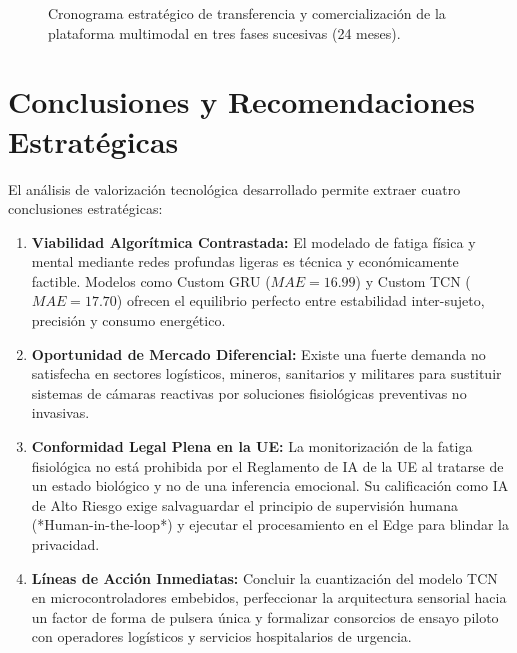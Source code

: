 \begin{figure}[H]
    \caption{Cronograma estratégico de transferencia y comercialización de la plataforma multimodal en tres fases sucesivas (24 meses).}
    \label{fig:roadmap_comercial}
\end{figure}



\section{Conclusiones y Recomendaciones Estratégicas}
\label{sec:val_conclusiones}

El análisis de valorización tecnológica desarrollado permite extraer cuatro conclusiones estratégicas:
\begin{enumerate}
    \item \textbf{Viabilidad Algorítmica Contrastada:} El modelado de fatiga física y mental mediante redes profundas ligeras es técnica y económicamente factible. Modelos como Custom GRU ($MAE = 16.99$) y Custom TCN ($MAE = 17.70$) ofrecen el equilibrio perfecto entre estabilidad inter-sujeto, precisión y consumo energético.
    \item \textbf{Oportunidad de Mercado Diferencial:} Existe una fuerte demanda no satisfecha en sectores logísticos, mineros, sanitarios y militares para sustituir sistemas de cámaras reactivas por soluciones fisiológicas preventivas no invasivas.
    \item \textbf{Conformidad Legal Plena en la UE:} La monitorización de la fatiga fisiológica no está prohibida por el Reglamento de IA de la UE al tratarse de un estado biológico y no de una inferencia emocional. Su calificación como IA de Alto Riesgo exige salvaguardar el principio de supervisión humana (*Human-in-the-loop*) y ejecutar el procesamiento en el Edge para blindar la privacidad.
    \item \textbf{Líneas de Acción Inmediatas:} Concluir la cuantización del modelo TCN en microcontroladores embebidos, perfeccionar la arquitectura sensorial hacia un factor de forma de pulsera única y formalizar consorcios de ensayo piloto con operadores logísticos y servicios hospitalarios de urgencia.
\end{enumerate}
